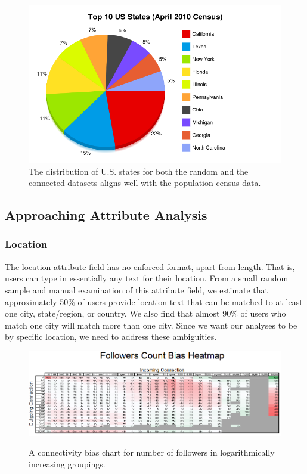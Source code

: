 \begin{figure}[t]
 \includegraphics[bb=0 0 800 500,scale=.2]{./images/loca-actu.png}
\caption{The distribution of U.S. states for both the random and the connected datasets aligns well with the population census data.}
\end{figure}

\subsection{Approaching Attribute Analysis}

\subsubsection{Location}

The location attribute field has no enforced format, apart from length.  That is, users can type in essentially any text for their location.  From a small random sample and manual examination of this attribute field, we estimate that approximately 50\% of users provide location text that can be matched to at least one city, state/region, or country.  We also find that almost 90\% of users who match one city will match more than one city.  Since we want our analyses to be by specific location, we need to address these ambiguities.

\begin{figure}[t]
 \centering
 \includegraphics[bb=0 0 664 222,scale=.62]{./images/followers_count.png}
 \label{fig:follower_count}
 \caption{A connectivity bias chart for number of followers in logarithmically increasing groupings.}
\end{figure}

